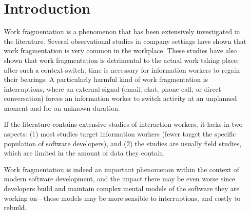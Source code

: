\documentclass[conference]{IEEEtran}
\begin{document}
\IEEEpeerreviewmaketitle




\section{Introduction}
% 
% 
% 
% 

Work fragmentation is a phenomenon that has been extensively investigated in the literature. Several observational studies in company settings have shown that work fragmentation is very common in the workplace. These studies have also shown that work fragmentation is detrimental to the actual work taking place: after such a context switch, time is necessary for information workers to regain their bearings. A particularly harmful kind of work fragmentation is interruptions, where an external signal (email, chat, phone call, or direct conversation) forces an information worker to switch activity at an unplanned moment and for an unknown duration.

If the literature contains extensive studies of interaction workers, it lacks in two aspects: (1) most studies target information workers (fewer target the specific population of software developers), and (2) the studies are usually field studies, which are limited in the amount of data they contain.

Work fragmentation is indeed an important phenomenon within the context of modern software development, and the impact there may be even worse since developers build and maintain complex mental models of the software they are working on---these models may be more sensible to interruptions, and costly to rebuild. %
\end{document}
